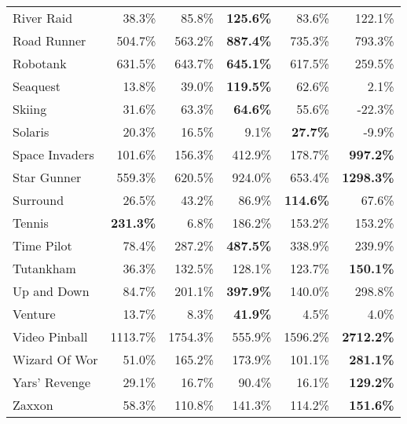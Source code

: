 \begin{table}[!htb]
\begin{center}
\begin{tabular}{l|rrr|rr}
          River Raid &    38.3\% &    85.8\% &{\bf125.6\%}&    83.6\% &     122.1\% \\
         Road Runner &   504.7\% &   563.2\% &{\bf887.4\%}&   735.3\% &     793.3\% \\
            Robotank &   631.5\% &   643.7\% &{\bf645.1\%}&   617.5\% &     259.5\% \\
            Seaquest &    13.8\% &    39.0\% &{\bf119.5\%}&    62.6\% &       2.1\% \\
              Skiing &    31.6\% &    63.3\% &{\bf64.6\%}&    55.6\% &     -22.3\% \\
             Solaris &    20.3\% &    16.5\% &     9.1\% &{\bf27.7\%}&      -9.9\% \\
      Space Invaders &   101.6\% &   156.3\% &   412.9\% &   178.7\% &{\bf997.2\%}\\
         Star Gunner &   559.3\% &   620.5\% &   924.0\% &   653.4\% &{\bf1298.3\%}\\
           Surround  &    26.5\% &    43.2\% &    86.9\% &{\bf114.6\%}&      67.6\% \\
              Tennis &{\bf231.3\%}&     6.8\% &   186.2\% &   153.2\% &     153.2\% \\
          Time Pilot &    78.4\% &   287.2\% &{\bf487.5\%}&   338.9\% &     239.9\% \\
           Tutankham &    36.3\% &   132.5\% &   128.1\% &   123.7\% &{\bf150.1\%}\\
         Up and Down &    84.7\% &   201.1\% &{\bf397.9\%}&   140.0\% &     298.8\% \\
             Venture &    13.7\% &     8.3\% &{\bf41.9\%}&     4.5\% &       4.0\% \\
       Video Pinball &  1113.7\% &  1754.3\% &   555.9\% &  1596.2\% &{\bf2712.2\%}\\
       Wizard Of Wor &    51.0\% &   165.2\% &   173.9\% &   101.1\% &{\bf281.1\%}\\
       Yars' Revenge &    29.1\% &    16.7\% &    90.4\% &    16.1\% &{\bf129.2\%}\\
              Zaxxon &    58.3\% &   110.8\% &   141.3\% &   114.2\% &{\bf151.6\%}\\
\end{tabular}
\end{center}
\end{table}


